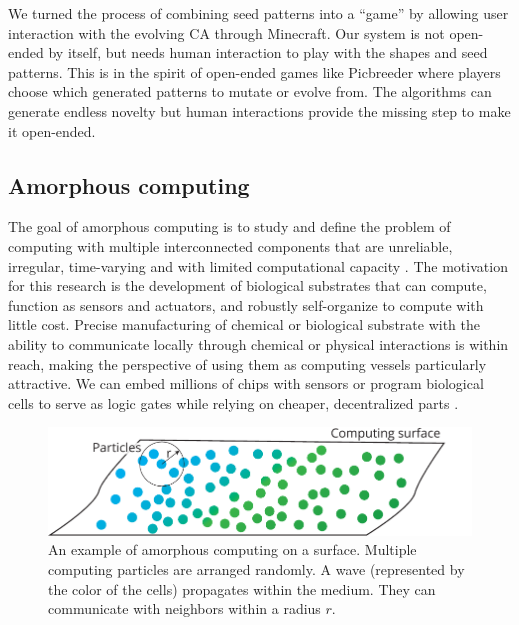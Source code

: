 We turned the process of combining seed patterns into a “game” by allowing user
interaction with the evolving CA through Minecraft. Our system is not open-ended
by itself, but needs human interaction to play with the shapes and seed
patterns. This is in the spirit of open-ended games like Picbreeder
\parencite{secretanPicbreederCaseStudy2011, woolleyDeleteriousEffectsPriori2011}
where players choose which generated patterns to mutate or evolve from. The
algorithms can generate endless novelty but human interactions provide the
missing step to make it open-ended.

\subsection{Amorphous computing}
The goal of amorphous computing is to study and define the problem of computing
with multiple interconnected components that are unreliable, irregular,
time-varying and with limited computational capacity
\parencite{abelsonAmorphousComputing2000}. The motivation for this research is
the development of biological substrates that can compute, function as sensors
and actuators, and robustly self-organize to compute with little cost. Precise
manufacturing of chemical or biological substrate with the ability to
communicate locally through chemical or physical interactions is within reach,
making the perspective of using them as computing vessels particularly
attractive. We can embed millions of chips with sensors
\parencite{abelsonAmorphousComputing2000} or program biological cells to serve
as logic gates \parencite{weissProgrammingBiologicalCells1998,
  weissVivoDigitalCircuits2002} while relying on cheaper, decentralized parts
\parencite{buteraProgrammingPaintableComputer2002}.

\begin{figure}[htbp]
  \centering
  \includegraphics[width=.8\linewidth]{figures/amorphous_computing}
  \caption{An example of amorphous computing on a surface. Multiple computing
    particles are arranged randomly. A wave (represented by the color of the
    cells) propagates within the medium. They can communicate with neighbors
    within a radius $r$.}
  \label{fig:amorphous_computing}
\end{figure}

